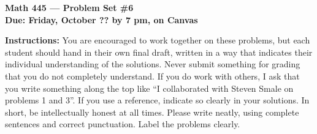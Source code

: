 \documentclass{amsart}
\begin{document}
\begin{center}
{\large\bfseries
Math 445 --- Problem Set \#6 \\
Due: Friday, October ?? by 7 pm, on Canvas}
\end{center}





{\bf Instructions:} You are encouraged to work together on these
problems, but each student should hand in their own final draft,
written in a way that indicates their individual understanding of
the solutions. Never submit something for grading
that you do not completely understand. If you do work with others, I ask that you write something along the
top like ``I collaborated with Steven Smale on problems 1 and 3''.
If you use a reference, indicate so clearly in your solutions. 
In short, be intellectually
honest at all times. Please write neatly, using complete sentences and correct
punctuation. Label the problems clearly. 
\end{document}
